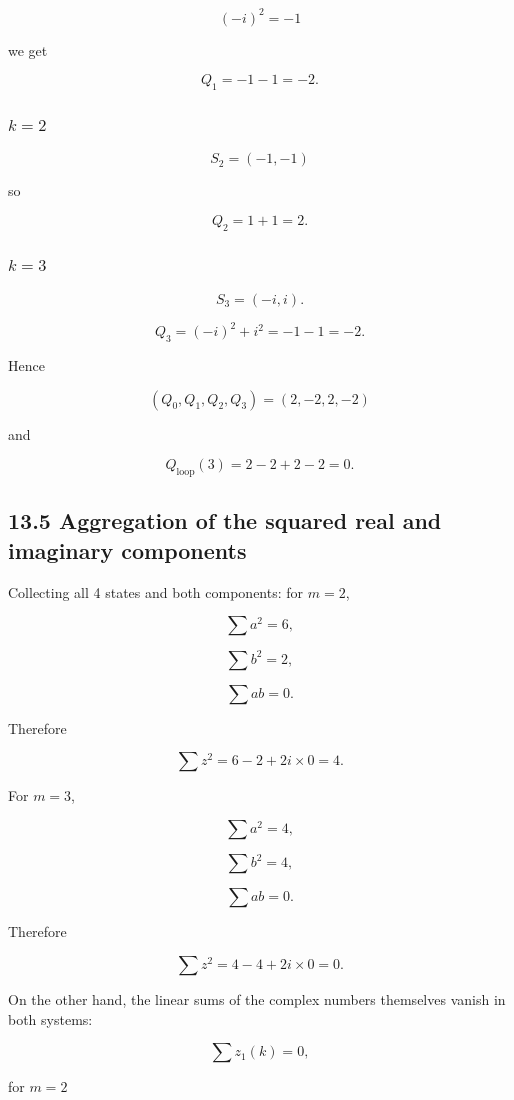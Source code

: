 \documentclass[
  a4paper,
]{article}
\begin{document}
\[
(-i)^2=-1
\]

we get

\[
Q_1
=
-1-1
=
-2.
\]

\subsubsection{\texorpdfstring{\(k=2\)}{k=2}}\label{k2-3}

\[
S_2=(-1,-1)
\]

so

\[
Q_2
=
1+1
=
2.
\]

\subsubsection{\texorpdfstring{\(k=3\)}{k=3}}\label{k3-3}

\[
S_3=(-i,i).
\]

\[
Q_3
=
(-i)^2+i^2
=
-1-1
=
-2.
\]

Hence

\[
\boxed{
(Q_0,Q_1,Q_2,Q_3)
=
(2,-2,2,-2)
}
\]

and

\[
Q_{\mathrm{loop}}(3)
=
2-2+2-2
=
\boxed{0}.
\]

\subsection{13.5 Aggregation of the squared real and imaginary
components}\label{aggregation-of-the-squared-real-and-imaginary-components}

Collecting all 4 states and both components: for \(m=2\),

\[
\sum a^2=6,
\]

\[
\sum b^2=2,
\]

\[
\sum ab=0.
\]

Therefore

\[
\sum z^2
=
6-2+2i\times0
=
4.
\]

For \(m=3\),

\[
\sum a^2=4,
\]

\[
\sum b^2=4,
\]

\[
\sum ab=0.
\]

Therefore

\[
\sum z^2
=
4-4+2i\times0
=
0.
\]

On the other hand, the linear sums of the complex numbers themselves
vanish in both systems:

\[
\sum z_1(k)=0,
\]

for \(m=2\)
\end{document}
